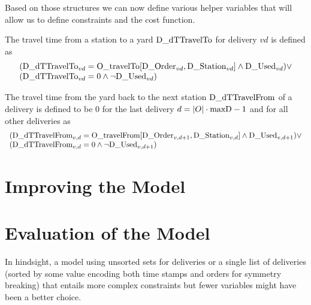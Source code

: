 \documentclass[a4paper]{article}
\newcommand{\OtravelTo}{\text{O\_travelTo}}
\newcommand{\OtravelFrom}{\text{O\_travelFrom}}
\begin{document}
\medskip

Based on those structures we can now define various helper variables that will allow us to define constraints and the
cost function.

The travel time from a station to a yard $\text{D\_dTTravelTo}$ for delivery $vd$ is defined as
\[
\begin{array}[b]{l}
(\DdTtravelTo_{vd} = \OtravelTo[\DOrder_{vd}, \DStation_{vd}] \wedge \DUsed_{vd}) \vee \\
(\DdTtravelTo_{vd} = 0 \wedge \neg \DUsed_{vd})
\end{array}
\]

The travel time from the yard back to the next station $\text{D\_dTTravelFrom}$ of a delivery is defined to be 0 for the last
delivery $d = |O| \cdot \text{maxD} - 1$ and for all other deliveries as
\[
\begin{array}[b]{l}
(\DdTtravelFrom_{v,d} = \OtravelFrom[\DOrder_{v,d+1}, \DStation_{v,d}] \wedge \DUsed_{v,d+1}) \vee \\
(\DdTtravelFrom_{v,d} = 0 \wedge \neg \DUsed_{v,d+1})
\end{array}
\]







\section{Improving the Model}



\section{Evaluation of the Model}


In hindsight, a model using unsorted sets for deliveries or a single list of deliveries (sorted by some value encoding
both time stamps and orders for symmetry breaking) that entails more complex constraints but fewer variables might have
been a better choice.


%
\end{document}
